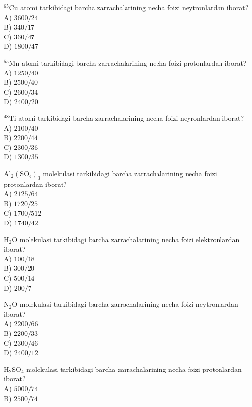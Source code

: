   \item ${ }^{65} \mathrm{Cu}$ atomi tarkibidagi barcha zarrachalarining necha foizi neytronlardan iborat?\\
A) $3600 / 24$\\
B) $340 / 17$\\
C) $360 / 47$\\
D) $1800 / 47$
  \item ${ }^{55} \mathrm{Mn}$ atomi tarkibidagi barcha zarrachalarining necha foizi protonlardan iborat?\\
A) $1250 / 40$\\
B) $2500 / 40$\\
C) $2600 / 34$\\
D) $2400 / 20$
  \item ${ }^{48} \mathrm{Ti}$ atomi tarkibidagi barcha zarrachalarining necha foizi neyronlardan iborat?\\
A) $2100 / 40$\\
B) $2200 / 44$\\
C) $2300 / 36$\\
D) $1300 / 35$
  \item $\mathrm{Al}_{2}\left(\mathrm{SO}_{4}\right)_{3}$ molekulasi tarkibidagi barcha zarrachalarining necha foizi protonlardan iborat?\\
A) $2125 / 64$\\
B) $1720 / 25$\\
C) $1700 / 512$\\
D) $1740 / 42$\\
  \item $\mathrm{H}_{2} \mathrm{O}$ molekulasi tarkibidagi barcha zarrachalarining necha foizi elektronlardan iborat?\\
A) $100 / 18$\\
B) $300 / 20$\\
C) $500 / 14$\\
D) $200 / 7$
  \item $\mathrm{N}_{2} \mathrm{O}$ molekulasi tarkibidagi barcha zarrachalarining necha foizi neytronlardan iborat?\\
A) $2200 / 66$\\
B) $2200 / 33$\\
C) $2300 / 46$\\
D) $2400 / 12$
  \item $\mathrm{H}_{2} \mathrm{SO}_{4}$ molekulasi tarkibidagi barcha zarrachalarining necha foizi protonlardan iborat?\\
A) $5000 / 74$\\
B) $2500 / 74$\\
